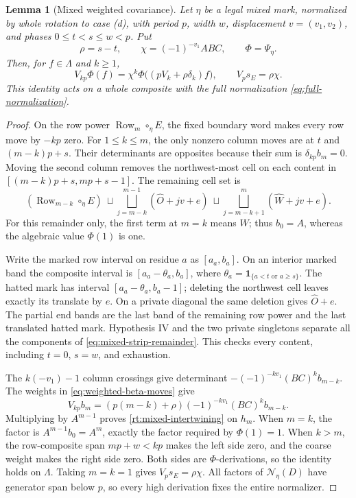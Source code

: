 \documentclass[11pt,a4paper]{amsart}
\numberwithin{equation}{section}
\theoremstyle{plain}
\newtheorem{lemma}[theorem]{Lemma}
\theoremstyle{definition}
\newcommand{\Lam}{\Lambda}
\begin{document}
\begin{lemma}[Mixed weighted covariance]\label{rt:mixed-covariance}
Let \(\eta\) be a legal mixed mark, normalized by whole rotation to case (d), with period \(p\), width \(w\), displacement \(v=(v_1,v_2)\), and phases \(0\le t<s\le w<p\).  Put
\[
 \rho=s-t,\qquad \chi=(-1)^{-v_1}ABC,\qquad \Phi=\Psi_\eta.
\]
Then, for \(f\in\Lam\) and \(k\ge1\),
\begin{equation}\label{rt:mixed-intertwining}
 V_{kp}\Phi(f)=\chi^k\Phi\bigl((pV_k+\rho\delta_k)f\bigr),
 \qquad V_p s_E=\rho\chi.
\end{equation}
This identity acts on a whole composite with the full normalization \eqref{eq:full-normalization}.
\end{lemma}
\begin{proof}
On the row power \(\operatorname{Row}_m\circ_\eta E\), the fixed boundary word makes every row move by \(-kp\) zero.  For \(1\le k\le m\), the only nonzero column moves are at \(t\) and \((m-k)p+s\).  Their determinants are opposites because their sum is \(\delta_{kp}b_m=0\).  Moving the second column removes the northwest-most cell on each content in \([(m-k)p+s,mp+s-1]\).  The remaining cell set is
\begin{equation}\label{eq:mixed-strip-remainder}
 (\operatorname{Row}_{m-k}\circ_\eta E)\ \sqcup\!
 \bigsqcup_{j=m-k}^{m-1}(\widehat O+jv+e)
 \ \sqcup\!
 \bigsqcup_{j=m-k+1}^{m}(\widehat W+jv+e).
\end{equation}
For this remainder only, the first term at \(m=k\) means \(W\); thus \(b_0=A\), whereas the algebraic value \(\Phi(1)\) is one.

Write the marked row interval on residue \(a\) as \([a_a,b_a]\).  On an interior marked band the composite interval is \([a_a-\theta_a,b_a]\), where \(\theta_a=\mathbf1_{\{a<t\text{ or }a\ge s\}}\).  The hatted mark has interval \([a_a-\theta_a,b_a-1]\); deleting the northwest cell leaves exactly its translate by \(e\).  On a private diagonal the same deletion gives \(\widehat O+e\).  The partial end bands are the last band of the remaining row power and the last translated hatted mark.  Hypothesis IV and the two private singletons separate all the components of \eqref{eq:mixed-strip-remainder}.  This checks every content, including \(t=0\), \(s=w\), and exhaustion.

The \(k(-v_1)-1\) column crossings give determinant
\(-(-1)^{-kv_1}(BC)^k b_{m-k}\).  The weights in \eqref{eq:weighted-beta-moves} give
\[
 V_{kp}b_m=(p(m-k)+\rho)(-1)^{-kv_1}(BC)^k b_{m-k}.
\]
Multiplying by \(A^{m-1}\) proves \eqref{rt:mixed-intertwining} on \(h_m\).  When \(m=k\), the factor is \(A^{m-1}b_0=A^m\), exactly the factor required by \(\Phi(1)=1\).  When \(k>m\), the row-composite span \(mp+w<kp\) makes the left side zero, and the coarse weight makes the right side zero.  Both sides are \(\Phi\)-derivations, so the identity holds on \(\Lam\).  Taking \(m=k=1\) gives \(V_p s_E=\rho\chi\).  All factors of \(\mathcal N_\eta(D)\) have generator span below \(p\), so every high derivation fixes the entire normalizer.
\end{proof}
\end{document}

